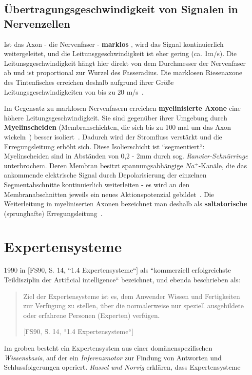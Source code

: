{\subsection{Übertragungsgeschwindigkeit von Signalen in Nervenzellen}
Ist das Axon - die Nervenfaser - \textbf{marklos} , wird das Signal kontinuierlich weitergeleitet, und die Leitunsggeschwindigkeit ist eher gering (ca. 1m/s).
Die Leitunsggeschwindigkeit hängt hier direkt von dem Durchmesser der Nervenfaser ab und ist proportional zur Wurzel des Fasseradius.
Die marklosen Riesenaxone des Tintenfisches erreichen deshalb aufgrund ihrer Größe Leitungsgeschwindigkeiten von bis zu 20 m/s~\cite[79]{Jon19}.

Im Gegensatz zu marklosen Nervenfasern erreichen \textbf{myelinisierte Axone}  eine höhere Leitungsgeschwindigkeit.
Sie sind gegenüber ihrer Umgebung durch \textbf{Myelinscheiden}  (Membranschichten, die sich bis zu 100 mal um das Axon wickeln~\cite[79]{Jon19}) besser isoliert~\cite[48]{SD07}.
Dadurch wird der Stromfluss verstärkt und die Erregungsleitung erhöht sich.
Diese Isolierschicht ist ``segmentiert``: Myelinscheiden sind in Abständen von 0,2 - 2mm durch sog.  \textit{Ranvier-Schnürringe} unterbrochem.
Deren Membran besitzt spannungsabhängige $Na^+$-Kanäle, die das ankommende elektrische Signal durch  Depolarisierung der einzelnen Segmentabschnitte kontinuierlich weiterleiten - es wird an den Membranabschnitten jeweils ein neues Aktionspotenzial gebildet~\cite[48]{SD07}.
Die Weiterleitung in myeliniserten Axonen bezeichnet man deshalb als \textbf{saltatorische} (sprunghafte) Erregungsleitung~\cite[109 f.]{BCP18}.


\section{Expertensysteme}\label{appendix:expertensystem}

1990 in [FS90, S. 14, ``1.4 Expertensysteme``] als ``kommerziell erfolgreichste Teildisziplin der Artificial intelligence`` bezeichnet, und ebenda beschrieben als:

\blockquote[{[FS90, S. 14, ``1.4 Expertensysteme``]}]{
    Ziel der Expertensysteme ist es, dem Anwender Wissen und Fertigkeiten zur Verfügung zu stellen, über die normalerweise nur speziell ausgebildete oder erfahrene Personen (Experten) verfügen.
}

\noindent
Im groben besteht ein Expertensystem aus einer domänenspezifischen \textit{Wissensbasis}, auf der ein \textit{Inferenzmotor} zur Findung von Antworten und Schlussfolgerungen operiert. \textit{Russel und Norvig} erklären, dass Expertensysteme

}
